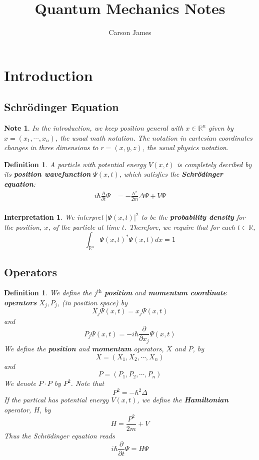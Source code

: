 \documentclass[12pt]{amsart}
\newtheorem{defn}[thm]{Definition}
\newtheorem{intp}[thm]{Interpretation}
\newtheorem{note}[thm]{Note}
\newcommand{\Del}{\Delta}
\newcommand{\R}{\mathbb{R}}
\newcommand{\p}[1]{\frac{\partial}{\partial{#1}}}
\begin{document}
\title{Quantum Mechanics Notes}
\author[James]{Carson James}
\maketitle


\tableofcontents

\section{Introduction}
\subsection{Schr\"{o}dinger Equation}

\begin{note}
In the introduction, we keep position general with $x \in \R^n$ given by $x = (x_1, \cdots, x_n)$, the usual math notation. The notation in cartesian coordinates changes in three dimensions to $r = (x,y,z)$, the usual physics notation. 
\end{note}

\begin{defn}
A particle with potential energy $V(x,t)$ is completely decribed by its \textbf{position wavefunction} $\Psi(x,t)$, which satisfies the \textbf{Schr\"{o}dinger equation}: 
\begin{align*}
i\hbar \p{t} \Psi 
&= -\frac{\hbar^2}{2m} \Del \Psi + V \Psi\\
\end{align*}
\end{defn}

\begin{intp}
We interpret $\vert\Psi(x,t)\vert^2$ to be the \textbf{probability density} for the position, $x$, of the particle at time $t$. Therefore, we require that for each $t \in \R$, $$\int_{\R^n}\Psi(x,t)^* \Psi(x,t) dx = 1$$
\end{intp}

\subsection{Operators}

\begin{defn}

We define the $j^{\text{th}}$ \textbf{position} and \textbf{momentum coordinate operators} $X_j,P_j$, (in position space) by $$X_j \Psi(x,t) = x_j \Psi(x,t)$$ and $$P_j \Psi(x,t) = -i \hbar \p{x_j} \Psi(x,t)$$ 
We define the \textbf{position} and \textbf{momentum} operators, $X$ and $P$, by $$X = (X_1, X_2, \cdots, X_n)$$ and $$P = (P_1, P_2, \cdots, P_n)$$
We denote $P \cdot P$ by $P^2$. Note that $$P^2 = -\hbar^2 \Del$$
If the partical has potential energy $V(x,t)$, we define the \textbf{Hamiltonian} operator, $H$, by $$H = \frac{P^2}{2m} + V$$ Thus the Schr\"{o}dinger equation reads $$i\hbar \p{t}\Psi = H \Psi$$ 
\end{defn}
\end{document}
